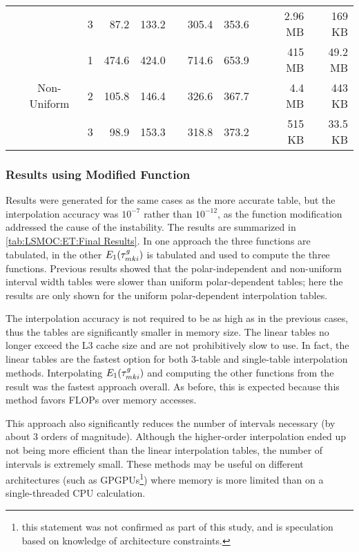 {{{{\begin{table}
\begin{tabular}{@{}ccrrrrrrrrr@{}}
                                                                              && 3 &  87.2 & 133.2 && 305.4 & 353.6 && 2.96 MB & 169 KB\\\cmidrule{2-11}\addlinespace[-0.2em]
                                                & \multirow{3}{*}{Non-Uniform} & 1 & 474.6 & 424.0 && 714.6 & 653.9 && 415 MB & 49.2 MB\\\addlinespace[-0.2em]
                                                                              && 2 & 105.8 & 146.4 && 326.6 & 367.7 && 4.4 MB & 443  KB\\\addlinespace[-0.2em]
                                                                              && 3 &  98.9 & 153.3 && 318.8 & 373.2 && 515 KB & 33.5 KB\\\bottomrule
          \end{tabular}
        \end{table}
      }
      \subsubsection{Results using Modified Function}{\label{sssec:LSMOC:ET:Results using Modified Function}
        Results were generated for the same cases as the more accurate table, but the interpolation accuracy was $10^{-7}$ rather than $10^{-12}$, as the function modification addressed the cause of the instability.
        The results are summarized in \cref{tab:LSMOC:ET:Final Results}.
        In one approach the three functions are tabulated, in the other $E_1(\segopt)$ is tabulated and used to compute the three functions.
        Previous results showed that the polar-independent and non-uniform interval width tables were slower than uniform polar-dependent tables; here the results are only shown for the uniform polar-dependent interpolation tables.

        The interpolation accuracy is not required to be as high as in the previous cases, thus the tables are significantly smaller in memory size.
        The linear tables no longer exceed the L3 cache size and are not prohibitively slow to use.
        In fact, the linear tables are the fastest option for both 3-table and single-table interpolation methods.
        Interpolating $E_1(\segopt)$ and computing the other functions from the result was the fastest approach overall.
        As before, this is expected because this method favors \acp{FLOP} over memory accesses.

        This approach also significantly reduces the number of intervals necessary (by about 3 orders of magnitude).
        Although the higher-order interpolation ended up not being more efficient than the linear interpolation tables, the number of intervals is extremely small.
        These methods may be useful on different architectures (such as \acp{GPGPU}\footnote{this statement was not confirmed as part of this study, and is speculation based on knowledge of architecture constraints.}) where memory is more limited than on a single-threaded \ac{CPU} calculation.

}}}}
